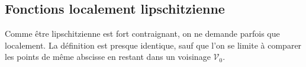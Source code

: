	
	\newpage
	\subsection{Fonctions localement lipschitzienne}
	Comme être lipschitzienne est fort contraignant, on ne demande parfois que 
	localement. La définition est presque identique, sauf que l'on se limite à 
	comparer les points de même abscisse en restant dans un voisinage $\mathcal{V}_0$.
	
	
	
	\setcounter{subsection}{3}
